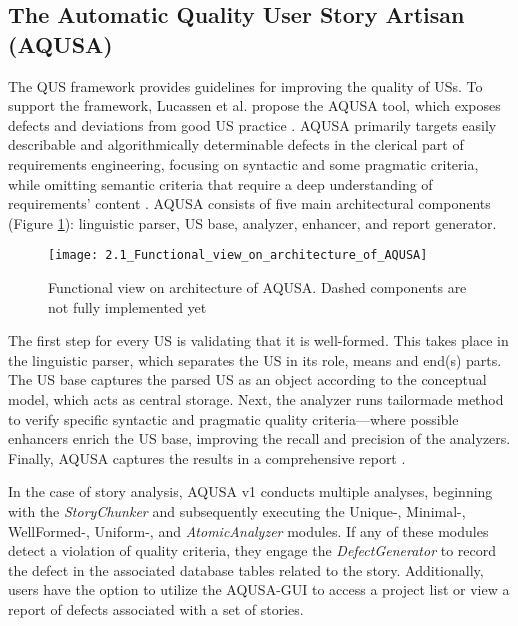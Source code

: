 \subsection*{The Automatic Quality User Story Artisan (AQUSA)} \label{aqusa}
The QUS framework provides guidelines for improving the quality of USs. To support the framework, Lucassen et al. propose the AQUSA tool, which exposes defects and deviations from good US practice \cite{lucassen2016improving}. AQUSA primarily targets easily describable and algorithmically determinable defects in the clerical part of requirements engineering, focusing on syntactic and some pragmatic criteria, while omitting semantic criteria that require a deep understanding of requirements' content \cite{lucassen2016improving}.
AQUSA consists of five main architectural components (Figure \ref{fig:aqusa}): linguistic parser, US base, analyzer, enhancer, and report generator.
\begin{figure}
\center
\texttt{[image: 2.1\_Functional\_view\_on\_architecture\_of\_AQUSA]}
\caption{Functional view on architecture of AQUSA. Dashed components are not fully implemented yet \cite{lucassen2016improving}}\label{fig:aqusa}
\end{figure}

The first step for every US is validating that it is well-formed. This takes place in the linguistic parser, which separates the US in its role, means and end(s) parts. The US base captures the parsed US as an object according to the conceptual model, which acts as central storage.  Next, the analyzer runs tailormade method to verify specific syntactic and pragmatic quality criteria—where possible enhancers enrich the US base, improving the recall and precision of the analyzers. Finally, AQUSA captures the results in a comprehensive report \cite{lucassen2016improving}.

In the case of story analysis, AQUSA v1 conducts multiple analyses, beginning with the \emph{StoryChunker} and subsequently executing the Unique-, Minimal-, WellFormed-, Uniform-, and \emph{AtomicAnalyzer} modules. If any of these modules detect a violation of quality criteria, they engage the \emph{DefectGenerator} to record the defect in the associated database tables related to the story. Additionally, users have the option to utilize the AQUSA-GUI to access a project list or view a report of defects associated with a set of stories.
